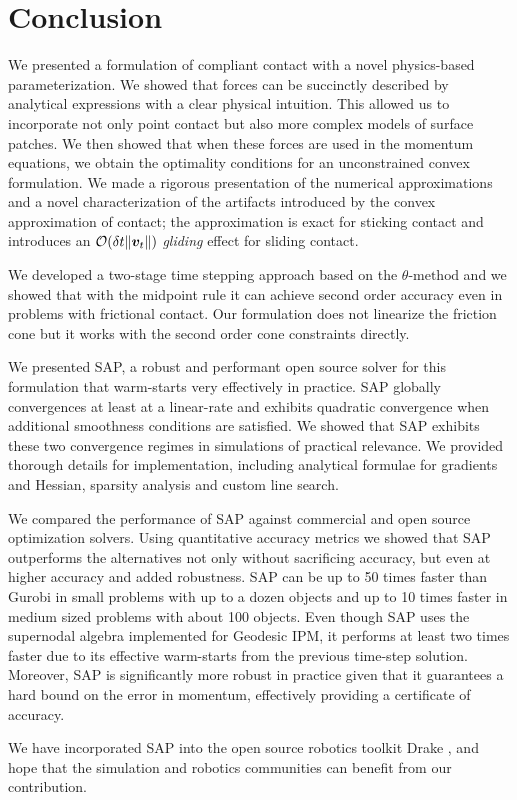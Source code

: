 \section{Conclusion}
\label{sec:future_directions}

We presented a formulation of compliant contact with a novel physics-based
parameterization. We showed that forces can be succinctly described by analytical
expressions with a clear physical intuition. This allowed us to incorporate not
only point contact but also more complex models of surface patches. We then showed
that when these forces are used in the momentum equations, we obtain the
optimality conditions for an unconstrained convex formulation. We made a
rigorous presentation of the numerical approximations and a novel
characterization of the artifacts introduced by the convex approximation of
contact; the approximation is exact for sticking contact and introduces an
$\mathcal{O}(\delta t\|{\bm{v}}_t\|)$ \emph{gliding} effect for sliding contact.

We developed a two-stage time stepping approach based on the
$\theta\text{-method}$ and we showed that with the midpoint rule it can achieve
second order accuracy even in problems with frictional contact. Our formulation
does not linearize the friction cone but it works with the second order cone
constraints directly.

We presented SAP, a robust and performant open source solver for this formulation that
warm-starts very effectively in practice. SAP 
globally convergences at least at a linear-rate and exhibits quadratic convergence when additional smoothness conditions are satisfied. We showed that SAP
exhibits these two convergence regimes in simulations of practical relevance. We
provided thorough details for implementation, including analytical
formulae for gradients and Hessian, sparsity analysis and custom line search.

We compared the performance of SAP against commercial and open source
optimization solvers. Using quantitative accuracy metrics we showed that SAP
outperforms the alternatives not only without sacrificing accuracy, but even at
higher accuracy and added robustness. SAP can be up to 50 times faster than
Gurobi in small problems with up to a dozen objects and up to 10 times faster in
medium sized problems with about 100 objects. Even though SAP uses the
supernodal algebra implemented for Geodesic IPM, it performs at least two times
faster due to its effective warm-starts from the previous time-step
solution. Moreover, SAP is significantly more robust in practice given
that it guarantees a hard bound on the error in momentum, effectively providing
a certificate of accuracy.

We have incorporated SAP into the open source robotics toolkit Drake
\cite{bib:drake}, and hope that the simulation and robotics communities can
benefit from our contribution.
